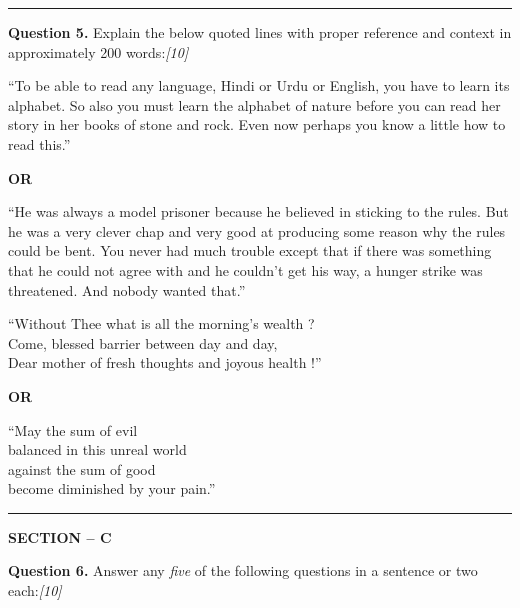\documentclass[11pt,a4paper]{article}
\newcommand{\pts}[1]{\hfill   \textit{[#1]}}
\begin{document}
\medskip\rule{\linewidth}{0.2pt}


\newpage




\noindent   \textbf{Question 5.}
Explain the below quoted lines with proper reference and context in approximately 200 words:\pts{10}

\begin{parts}
  \item ``To be able to read any language, Hindi or Urdu or English, you have to learn its alphabet. So also you must learn the alphabet of nature before you can read her story in her books of stone and rock. Even now perhaps you know a little how to read this.''
  
\begin{center}{\bfseries OR}\end{center}
  ``He was always a model prisoner because he believed in sticking to the rules. But he was a very clever chap and very good at producing some reason why the rules could be bent. You never had much trouble except that if there was something that he could not agree with and he couldn't get his way, a hunger strike was threatened. And nobody wanted that.''
  \item ``Without Thee what is all the morning's wealth ? \\ Come, blessed barrier between day and day, \\ Dear mother of fresh thoughts and joyous health !''
  
\begin{center}{\bfseries OR}\end{center}
  ``May the sum of evil \\ balanced in this unreal world \\ against the sum of good \\ become diminished by your pain.''
\end{parts}

\medskip\rule{\linewidth}{0.2pt}


\begin{center}
  {\bfseries SECTION -- C}
\end{center}




\noindent   \textbf{Question 6.}
Answer any   \textit{five} of the following questions in a sentence or two each:\pts{10}
\end{document}
